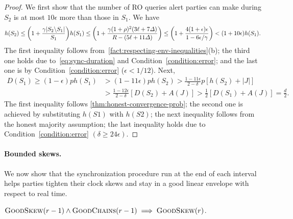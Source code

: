 \begin{proof}
    We first show that the number of RO queries alert parties can make during $S_2$ is at most $10\epsilon$ more than those in $S_1$.
    We have
    \[ h(S_2) \le \bigg( 1 + \frac{\gamma |S_2 \backslash S_1|}{S_1} \bigg) h(S_1) \le \bigg( 1 + \frac{\gamma (1 + \rho)^2 (3\ell + 7\varDelta)}{R - (5\ell + 11 \varDelta)} \bigg) \le \bigg( 1 + \frac{4(1 + \epsilon) \epsilon }{1 - 6 \epsilon / \gamma}\bigg) < (1 + 10\epsilon)h(S_1). \]
    The first inequality follows from~\cref{fact:respecting-env-inequalities}(b); the third one holds due to~\cref{eq:sync-duration} and Condition~\eqref{condition:error}; and the last one is by Condition~\eqref{condition:error} ($\epsilon < 1 /12$).
    Next,
    \begin{align*}
        D(S_1) \ge (1 - \epsilon) ph(S_1) & > (1 - 11 \epsilon) ph(S_2) > \frac{1 - 11 \epsilon}{2 - \delta} p [h(S_2) + |J|]               \\
                                          & > \frac{1 - 12\epsilon}{2 - \delta}[D(S_2) + A(J)] > \frac{1}{2} [D(S_1) + A(J)] = \frac{d}{2}.
    \end{align*}
    The first inequality follows \cref{thm:honest-convergence-prob}; the second one is achieved by substituting $h(S1)$ with $h(S2)$; the next inequality follows from the honest majority assumption; the last inequality holds due to Condition~\eqref{condition:error} $(\delta \ge 24\epsilon)$.
\end{proof}

\paragraph{Bounded skews.}
%
We now show that the synchronization procedure run at the end of each interval helps parties tighten their clock skews and stay in a good linear envelope with respect to real time.

\begin{lemma} \label{lemma:good-skew}
    $\textsc{GoodSkew}(r - 1) \wedge \textsc{GoodChains}(r - 1) \implies \textsc{GoodSkew}(r)$.
\end{lemma}

